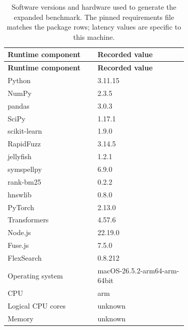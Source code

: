 \begin{small}
\setlength{\tabcolsep}{1.5pt}
\renewcommand{\arraystretch}{1.05}
\begin{longtable}{@{}L{0.35\linewidth}L{0.35\linewidth}@{}}
\caption{Software versions and hardware used to generate the expanded benchmark. The pinned requirements file matches the package rows; latency values are specific to this machine.}\label{tab:expanded-runtime-versions}\\
\toprule
\textbf{Runtime component} & \textbf{Recorded value} \\
\midrule
\endfirsthead
\toprule
\textbf{Runtime component} & \textbf{Recorded value} \\
\midrule
\endhead
Python & 3.11.15 \\
NumPy & 2.3.5 \\
pandas & 3.0.3 \\
SciPy & 1.17.1 \\
scikit-learn & 1.9.0 \\
RapidFuzz & 3.14.5 \\
jellyfish & 1.2.1 \\
symspellpy & 6.9.0 \\
rank-bm25 & 0.2.2 \\
hnswlib & 0.8.0 \\
PyTorch & 2.13.0 \\
Transformers & 4.57.6 \\
Node.js & 22.19.0 \\
Fuse.js & 7.5.0 \\
FlexSearch & 0.8.212 \\
Operating system & macOS-26.5.2-arm64-arm-64bit \\
CPU & arm \\
Logical CPU cores & unknown \\
Memory & unknown \\
\bottomrule
\end{longtable}
\end{small}

